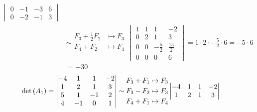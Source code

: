 \begin{enumerate}[label=\listAlph]
\[\begin{aligned}
\begin{vmatrix}
                        0 & -1 & -3 & 6 \\
                        0 & -2 & -1 & 3
                    \end{vmatrix}
                    \\
                    &\sim 
                    \begin{aligned}
                        F_3 + \frac{1}{2}F_2 &\mapsto F_3 \\
                        F_4 + F_2 &\mapsto F_4 \\
                    \end{aligned}
                    \begin{vmatrix}
                        1 & 1 & 1 & -2 \\
                        0 & 2 & 1 & 3 \\
                        0 & 0 & -\frac{5}{2} & \frac{15}{2} \\
                        0 & 0 & 0 & 6
                    \end{vmatrix}
                    = 1 \cdot 2 \cdot -\frac{5}{2} \cdot 6
                    = -5 \cdot 6 
                    \\
                    &= -30
                \end{aligned}
            \]
            \[
                \begin{aligned}
                    \text{det} \left( A_1 \right) 
                    &= 
                    \begin{vmatrix}
                        -4 & 1 & 1 & -2 \\
                        1 & 2 & 1 & 3 \\
                        5 & 1 & -1 & 2 \\
                        4 & -1 & 0 & 1
                    \end{vmatrix}
                    \sim
                    \begin{aligned}
                        F_3 + F_1 &\mapsto F_3 \\
                        F_3 - F_2 &\mapsto F_3 \\
                        F_4 + F_1 &\mapsto F_4 \\
                    \end{aligned}
                    \begin{vmatrix}
                        -4 & 1 & 1 & -2 \\
                        1 & 2 & 1 & 3 \\

\end{vmatrix}
\end{aligned}\]
\end{enumerate}
